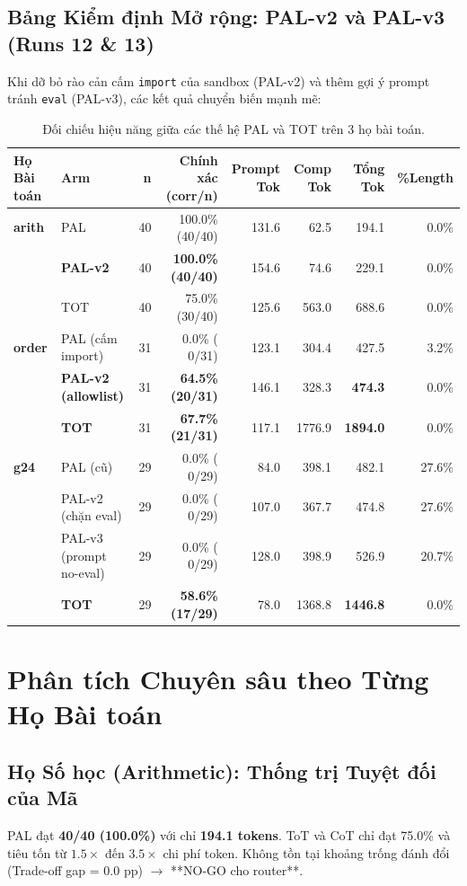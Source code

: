 \documentclass[11pt,a4paper]{report}
\begin{document}
\section{Bảng Kiểm định Mở rộng: PAL-v2 và PAL-v3 (Runs 12 \& 13)}
Khi dỡ bỏ rào cản cấm \texttt{import} của sandbox (PAL-v2) và thêm gợi ý prompt tránh \texttt{eval} (PAL-v3), các kết quả chuyển biến mạnh mẽ:

\begin{table}[h!]
\centering\small
\begin{tabularx}{\textwidth}{llrrrrrr}
\toprule
\textbf{Họ Bài toán} & \textbf{Arm} & \textbf{n} & \textbf{Chính xác (corr/n)} & \textbf{Prompt Tok} & \textbf{Comp Tok} & \textbf{Tổng Tok} & \textbf{\%Length} \\
\midrule
\textbf{arith} & PAL & 40 & 100.0\% (40/40) & 131.6 & 62.5 & 194.1 & 0.0\% \\
& \textbf{PAL-v2} & 40 & \textbf{100.0\% (40/40)} & 154.6 & 74.6 & 229.1 & 0.0\% \\
& TOT & 40 & 75.0\% (30/40) & 125.6 & 563.0 & 688.6 & 0.0\% \\
\midrule
\textbf{order} & PAL (cấm import) & 31 & 0.0\% ( 0/31) & 123.1 & 304.4 & 427.5 & 3.2\% \\
& \textbf{PAL-v2 (allowlist)} & 31 & \textbf{64.5\% (20/31)} & 146.1 & 328.3 & \textbf{474.3} & 0.0\% \\
& \textbf{TOT} & 31 & \textbf{67.7\% (21/31)} & 117.1 & 1776.9 & \textbf{1894.0} & 0.0\% \\
\midrule
\textbf{g24} & PAL (cũ) & 29 & 0.0\% ( 0/29) & 84.0 & 398.1 & 482.1 & 27.6\% \\
& PAL-v2 (chặn eval) & 29 & 0.0\% ( 0/29) & 107.0 & 367.7 & 474.8 & 27.6\% \\
& PAL-v3 (prompt no-eval) & 29 & 0.0\% ( 0/29) & 128.0 & 398.9 & 526.9 & 20.7\% \\
& \textbf{TOT} & 29 & \textbf{58.6\% (17/29)} & 78.0 & 1368.8 & \textbf{1446.8} & 0.0\% \\
\bottomrule
\end{tabularx}
\caption{Đối chiếu hiệu năng giữa các thế hệ PAL và TOT trên 3 họ bài toán.}
\end{table}

\newpage

\chapter{Phân tích Chuyên sâu theo Từng Họ Bài toán}

\section{Họ Số học (Arithmetic): Thống trị Tuyệt đối của Mã}
\begin{tcolorbox}[title=Kết luận Then chốt trên Họ Số học]
PAL đạt \textbf{40/40 (100.0\%)} với chỉ \textbf{194.1 tokens}. ToT và CoT chỉ đạt 75.0\% và tiêu tốn từ $1.5\times$ đến $3.5\times$ chi phí token. Không tồn tại khoảng trống đánh đổi (Trade-off gap = 0.0 pp) $\to$ **NO-GO cho router**.
\end{tcolorbox}
\end{document}
